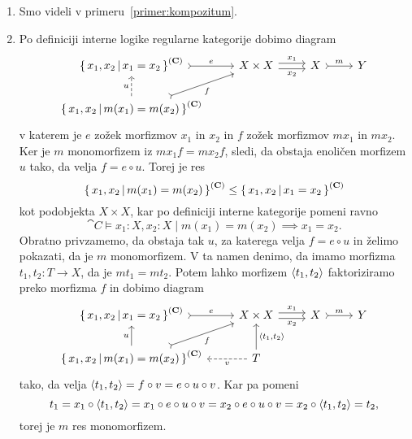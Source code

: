 \documentclass[../kategoricna_logika.tex]{subfiles}
\begin{document}
\begin{dokaz}
  \begin{enumerate}[label=(\roman*)]
  \item Smo videli v primeru~\ref{primer:kompozitum}.

  \item Po definiciji interne logike regularne
    kategorije dobimo diagram
    \begin{equation*}
      \begin{tikzcd}
        \setb{x_1,x_2}{x_1 = x_2}^{(\cat{C})} \ar[r, tail, "e"] & X \times X \ar[r, shift left, "x_1"] \ar[r, shift right, "x_2"'] & X \ar[r, tail, "m"] & Y \\
        \setb{x_1,x_2}{m(x_1) = m(x_2)}^{(\cat{C})} \ar[ur, tail,
        "f"'] \ar[u, dashed, "u"]
      \end{tikzcd}
    \end{equation*}
    v katerem je $e$ zožek morfizmov $x_1$ in $x_2$ in $f$ zožek
    morfizmov $m x_1$ in $m x_2$.  Ker je $m$ monomorfizem iz
    $m x_1 f = m x_2 f$, sledi, da obstaja enoličen morfizem $u$ tako,
    da velja $f = e \circ u$. Torej je res
      $$\left\lbrace\, x_1,x_2 \,\middle|\, m(x_1) = m(x_2) \,\right\rbrace^{({\operatorname{\mathbf{C}}})} \leq \left\lbrace\, x_1,x_2 \,\middle|\, x_1 = x_2 \,\right\rbrace^{({\operatorname{\mathbf{C}}})}$$
      kot podobjekta $X \times X$, kar po definiciji interne
      kategorije pomeni ravno
      \[\cat{C} \models x_1:X, x_2:X \mid  m(x_1) = m(x_2) \implies x_1 = x_2.\]
      Obratno privzamemo, da obstaja tak $u$, za katerega velja
      $f = e \circ u$ in želimo pokazati, da je $m$ monomorfizem.  V
      ta namen denimo, da imamo morfizma $t_1, t_2 : T \to X$, da je
      $m t_1 = m t_2$.  Potem lahko morfizem $\langle t_1, t_2 \rangle$
      faktoriziramo preko morfizma $f$ in dobimo diagram
      \begin{equation*}
        \begin{tikzcd}
          \setb{x_1,x_2}{x_1 = x_2}^{(\cat{C})} \ar[r, tail, "e"] & X \times X \ar[r, shift left, "x_1"] \ar[r, shift right, "x_2"'] & X \ar[r, tail, "m"] & Y \\
          \setb{x_1,x_2}{m(x_1) = m(x_2)}^{(\cat{C})} \ar[ur, tail,
          "f"'] \ar[u, "u"] & T \ar[u, "\fprod{t_1, t_2}"'] \ar[l,
          dashed, "v"]
        \end{tikzcd}
      \end{equation*}
      tako, da velja
      $\langle t_1, t_2 \rangle = f \circ v = e \circ u \circ v$. Kar pa
      pomeni
      $$t_1 = x_1 \circ \langle t_1, t_2 \rangle = x_1 \circ e \circ u \circ v = x_2 \circ e \circ u \circ v = x_2 \circ \langle t_1, t_2 \rangle = t_2,$$
      torej je $m$ res monomorfizem.


\end{enumerate}
\end{dokaz}
\end{document}
